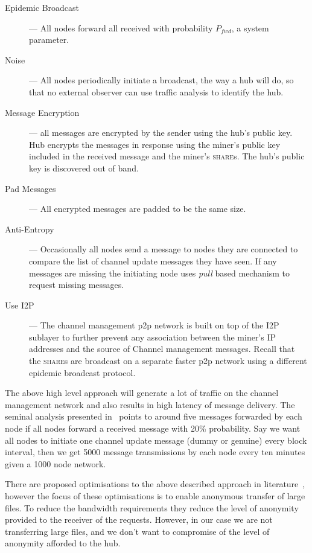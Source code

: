 \documentclass{article}
\begin{document}
\begin{description}
\item[Epidemic Broadcast] --- All nodes forward all received with
  probability $P_{fwd}$, a system parameter.
\item[Noise] --- All nodes periodically initiate a broadcast, the way
  a hub will do, so that no external observer can use traffic analysis
  to identify the hub.
\item[Message Encryption] --- all messages are encrypted by the sender
  using the hub's public key. Hub encrypts the messages in response
  using the miner's public key included in the received message and
  the miner's \textsc{share}s. The hub's public key is discovered out
  of band.
\item[Pad Messages] --- All encrypted messages are padded to be the
  same size.
\item[Anti-Entropy] --- Occasionally all nodes send a message to
  nodes they are connected to compare the list of channel update
  messages they have seen. If any messages are missing the initiating
  node uses \emph{pull} based mechanism to request missing messages.
\item[Use I2P] --- The channel management p2p network is built on top
  of the I2P~\cite{i2p-censorship-resistance} sublayer to further
  prevent any association between the miner's IP addresses and the
  source of Channel management messages. Recall that the
  \textsc{share}s are broadcast on a separate faster p2p network using
  a different epidemic broadcast protocol.
\end{description}

The above high level approach will generate a lot of traffic on the
channel management network and also results in high latency of message
delivery. The seminal analysis presented in~\cite{epidemic-algorithms}
points to around five messages forwarded by each node if all nodes
forward a received message with 20\% probability. Say we want all
nodes to initiate one channel update message (dummy or genuine) every
block interval, then we get 5000 message transmissions by each node
every ten minutes given a 1000 node network.

There are proposed optimisations to the above described approach in
literature~\cite{responder-anonymity:file-sharing, liu2010rumor,
  responder-anonymity:p2p, gap-gnunet, rumor-riding, p5}, however the
focus of these optimisations is to enable anonymous transfer of large
files. To reduce the bandwidth requirements they reduce the level of
anonymity provided to the receiver of the requests. However, in our
case we are not transferring large files, and we don't want to
compromise of the level of anonymity afforded to the hub.
\end{document}
